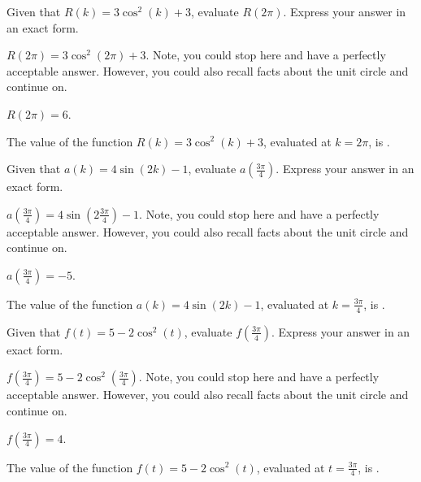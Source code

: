 \begin{shuffle} %
\begin{exercise}
Given that $R(k)=3 \cos ^2(k)+3$, evaluate $R\left(2 \pi\right)$. Express your answer in an exact form.
\begin{solution}
\begin{hint}
$R\left(2 \pi\right)=3 \cos ^2\left(2 \pi\right)+3$. Note, you could stop here and have a perfectly acceptable answer. However, you could also recall facts about the unit circle and continue on. 
\end{hint}
\begin{hint}
$R\left(2 \pi\right)=6$.
\end{hint}
The value of the function $R(k)=3 \cos ^2(k)+3$, evaluated at $k=2 \pi$, is .
\end{solution}
\end{exercise}

\begin{exercise}
Given that $a(k)=4 \sin (2 k)-1$, evaluate $a\left(\frac{3 \pi }{4}\right)$. Express your answer in an exact form.
\begin{solution}
\begin{hint}
$a\left(\frac{3 \pi }{4}\right)=4 \sin \left(2 \frac{3 \pi }{4}\right)-1$. Note, you could stop here and have a perfectly acceptable answer. However, you could also recall facts about the unit circle and continue on. 
\end{hint}
\begin{hint}
$a\left(\frac{3 \pi }{4}\right)=-5$.
\end{hint}
The value of the function $a(k)=4 \sin (2 k)-1$, evaluated at $k=\frac{3 \pi }{4}$, is .
\end{solution}
\end{exercise}

\begin{exercise}
Given that $f(t)=5-2 \cos ^2(t)$, evaluate $f\left(\frac{3 \pi }{4}\right)$. Express your answer in an exact form.
\begin{solution}
\begin{hint}
$f\left(\frac{3 \pi }{4}\right)=5-2 \cos ^2\left(\frac{3 \pi }{4}\right)$. Note, you could stop here and have a perfectly acceptable answer. However, you could also recall facts about the unit circle and continue on. 
\end{hint}
\begin{hint}
$f\left(\frac{3 \pi }{4}\right)=4$.
\end{hint}
The value of the function $f(t)=5-2 \cos ^2(t)$, evaluated at $t=\frac{3 \pi }{4}$, is .
\end{solution}
\end{exercise}


\end{shuffle}

